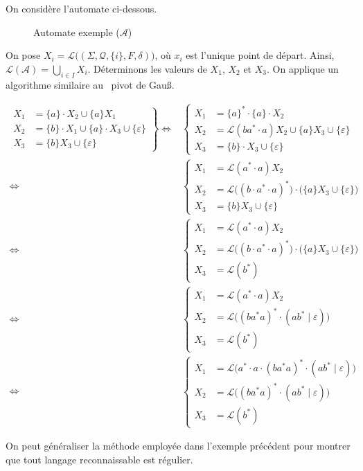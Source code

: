 \documentclass[a4paper]{article}
\begin{document}
	\begin{exm}
		On considère l'automate ci-dessous.
		\begin{figure}[H]
			\centering
			\caption{Automate exemple ($\mathcal{A}$)}
		\end{figure}
		On pose $X_i = \mathcal{L}\big((\Sigma, \mathcal{Q}, \{i\}, F, \delta)\big)$, où $x_i$ est l'unique point de départ.
		Ainsi, $\mathcal{L}(\mathcal{A}) = \bigcup_{i \in  I} X_i$.
		Déterminons les valeurs de $X_1$, $X_2$ et $X_3$.
		On applique un algorithme similaire au \guillemotleft~pivot de Gau\ss.~\guillemotright\ 

		\begin{align*}
			\left.\begin{array}{rl}
				X_1 &= \{a\} \cdot X_2 \cup \{a\} X_1\\
				X_2 &= \{b\} \cdot X_1 \cup \{a\} \cdot X_3 \cup \{\varepsilon\}\\
				X_3 &= \{b\} X_3 \cup \{\varepsilon\}
			\end{array}\right\}
			\iff& 
			\begin{cases}
				X_1&= \{a\}^* \cdot \{a\} \cdot X_2\\
				X_2&= \mathcal{L}(ba^* \cdot a) X_2 \cup \{a\} X_3 \cup \{\varepsilon\}\\
				X_3&= \{b\} \cdot X_3 \cup \{\varepsilon\}
			\end{cases}\\
			\iff& 
			\begin{cases}
				X_1&= \mathcal{L}(a^* \cdot a) X_2\\
				X_2&= \mathcal{L}\big((b\cdot a^* \cdot a)^*\big) \cdot \big(\{a\} X_3 \cup \{\varepsilon\}\big)\\
				X_3&= \{b\} X_3 \cup \{\varepsilon\}
			\end{cases}\\
			\iff& \begin{cases}
				X_1&= \mathcal{L}(a^* \cdot a) X_2\\
				X_2&= \mathcal{L}\big((b\cdot a^* \cdot a)^*\big) \cdot \big(\{a\} X_3 \cup \{\varepsilon\}\big)\\
				X_3&= \mathcal{L}(b^*)
			\end{cases} \\
			\iff& \begin{cases}
				X_1&= \mathcal{L}(a^* \cdot a) X_2\\
				X_2&= \mathcal{L}\big((ba^*a)^* \cdot (ab^*  \mid \varepsilon)\big)\\
				X_3&= \mathcal{L}(b^*)
			\end{cases} \\
			\iff& \begin{cases}
				X_1&= \mathcal{L}\big(a^* \cdot a \cdot (ba^*a)^* \cdot (ab^*  \mid \varepsilon)\big)\\
				X_2&= \mathcal{L}\big((ba^*a)^* \cdot (ab^*  \mid \varepsilon)\big)\\
				X_3&= \mathcal{L}(b^*)
			\end{cases}
		\end{align*}
	\end{exm}

	On peut généraliser la méthode employée dans l'exemple précédent pour montrer que tout langage reconnaissable est régulier.
\end{document}
